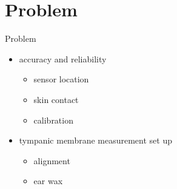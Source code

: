 \documentclass[en]{sdqbeamer}
\begin{document}
\section{Problem}
\begin{frame}{Problem}
    \begin{itemize}
        \item accuracy and reliability
        \begin{itemize}
            \item sensor location
            \item skin contact
            \item calibration
        \end{itemize}
        \item tympanic membrane measurement set up
        \begin{itemize}
            \item alignment
            \item ear wax
        \end{itemize}
    \end{itemize}
\end{frame}
\end{document}
